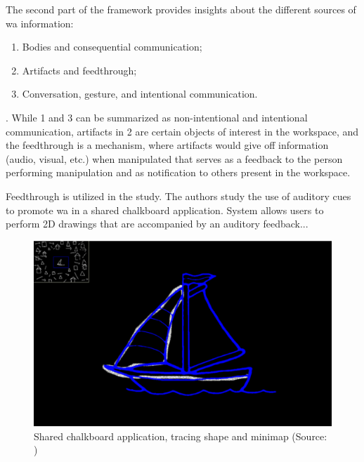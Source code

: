 The second part of the framework provides insights about the different sources of \gls{wa} information: 
\begin{enumerate}
	\item Bodies and consequential communication;
	\item Artifacts and feedthrough;
	\item Conversation, gesture, and intentional communication.
\end{enumerate}.
While 1 and 3 can be summarized as non-intentional and intentional communication, artifacts in 2 are certain objects of interest in the workspace, and the feedthrough is a mechanism, where artifacts would give off information (audio, visual, etc.) when manipulated that serves as a feedback to the person performing manipulation and as notification to others present in the workspace.

Feedthrough is utilized in the \cite{gutwin_chalk_2011} study. The authors study the use of auditory cues to promote \gls{wa} in a shared chalkboard application. System allows users to perform 2D drawings that are accompanied by an auditory feedback...
\begin{figure}
	\centering
	\includegraphics[width=0.7\linewidth]{figures/gutwin_chalk_2011}
	\caption{Shared chalkboard application, tracing shape and minimap (Source: \cite{gutwin_chalk_2011})}
	\label{fig:gutwinchalk2011}
\end{figure}

